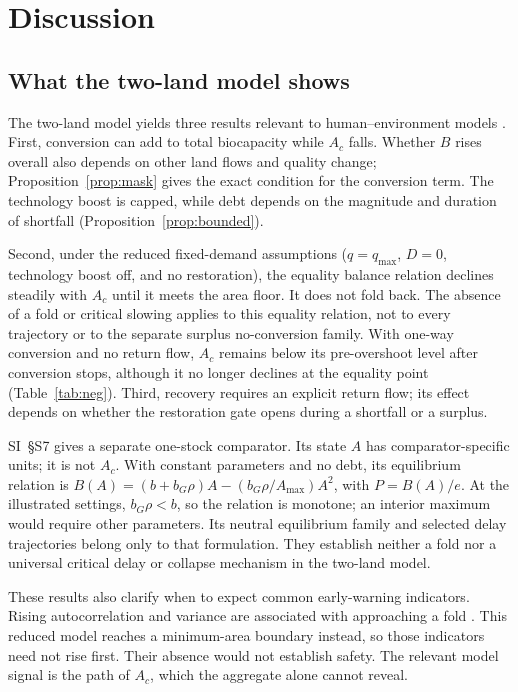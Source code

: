 \section{Discussion}\label{sec:discussion}

\subsection{What the two-land model shows}

The two-land model yields three results relevant to human--environment models \citep{Schaefer1954,May1973,Meadows1972,Meadows2004,WackernagelRees1996,BranderTaylor1998}. First, conversion can add to total biocapacity while $A_c$ falls. Whether $B$ rises overall also depends on other land flows and quality change; Proposition~\ref{prop:mask} gives the exact condition for the conversion term. The technology boost is capped, while debt depends on the magnitude and duration of shortfall (Proposition~\ref{prop:bounded}).

Second, under the reduced fixed-demand assumptions ($q=q_{\max}$, $D=0$, technology boost off, and no restoration), the equality balance relation declines steadily with $A_c$ until it meets the area floor. It does not fold back. The absence of a fold or critical slowing applies to this equality relation, not to every trajectory or to the separate surplus no-conversion family. With one-way conversion and no return flow, $A_c$ remains below its pre-overshoot level after conversion stops, although it no longer declines at the equality point (Table~\ref{tab:neg}). Third, recovery requires an explicit return flow; its effect depends on whether the restoration gate opens during a shortfall or a surplus.

SI~\S S7 gives a separate one-stock comparator. Its state $A$ has comparator-specific units; it is not $A_c$. With constant parameters and no debt, its equilibrium relation is $B(A)=(b+b_G\rho)A-(b_G\rho/A_{\max})A^2$, with $P=B(A)/e$. At the illustrated settings, $b_G\rho<b$, so the relation is monotone; an interior maximum would require other parameters. Its neutral equilibrium family and selected delay trajectories belong only to that formulation. They establish neither a fold nor a universal critical delay or collapse mechanism in the two-land model.

These results also clarify when to expect common early-warning indicators. Rising autocorrelation and variance are associated with approaching a fold \citep{Scheffer2001}. This reduced model reaches a minimum-area boundary instead, so those indicators need not rise first. Their absence would not establish safety. The relevant model signal is the path of $A_c$, which the aggregate alone cannot reveal.

